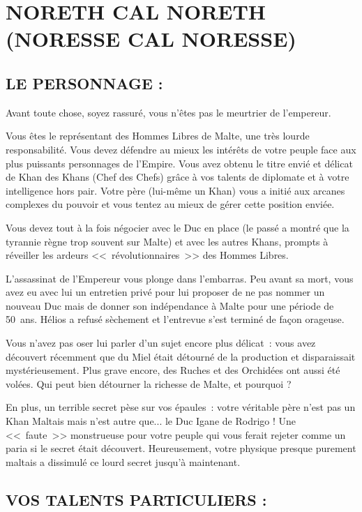 \documentclass[14pt,twocolumn]{extarticle}
\begin{document}
\section{NORETH CAL NORETH\\(NORESSE CAL NORESSE)}

\subsection{LE PERSONNAGE :}

Avant toute chose, soyez rassuré, vous n'êtes pas le meurtrier de l'empereur.

Vous êtes le représentant des Hommes Libres de Malte, une très lourde
responsabilité. Vous devez défendre au mieux les intérêts de votre peuple face
aux plus puissants personnages de l'Empire. Vous avez obtenu le titre envié et
délicat de Khan des Khans (Chef des Chefs) grâce à vos talents de diplomate et
à votre intelligence hors pair. Votre père (lui-même un Khan) vous a initié
aux arcanes complexes du pouvoir et vous tentez au mieux de gérer cette
position enviée.

Vous devez tout à la fois négocier avec le Duc en place (le passé a montré que
la tyrannie règne trop souvent sur Malte) et avec les autres Khans, prompts à
réveiller les ardeurs <<~révolutionnaires~>> des Hommes Libres.

L'assassinat de l'Empereur vous plonge dans l'embarras. Peu avant sa mort, vous
avez eu avec lui un entretien privé pour lui proposer de ne pas nommer un
nouveau Duc mais de donner son indépendance à Malte pour une période de 50~ans.
Hélios a refusé sèchement et l'entrevue s'est terminé de façon orageuse.

Vous n'avez pas oser lui parler d'un sujet encore plus délicat~: vous avez
découvert récemment que du Miel était détourné de la production et
disparaissait mystérieusement. Plus grave encore, des Ruches et des Orchidées
ont aussi été volées. Qui peut bien détourner la richesse de Malte, et
pourquoi ?

En plus, un terrible secret pèse sur vos épaules~: votre véritable père n'est
pas un Khan Maltais mais n'est autre que... le Duc Igane de Rodrigo ! Une
<<~faute~>> monstrueuse pour votre peuple qui vous ferait rejeter comme un
paria si le secret était découvert. Heureusement, votre physique presque
purement maltais a dissimulé ce lourd secret jusqu'à maintenant.

\subsection{VOS TALENTS PARTICULIERS :}
\end{document}
